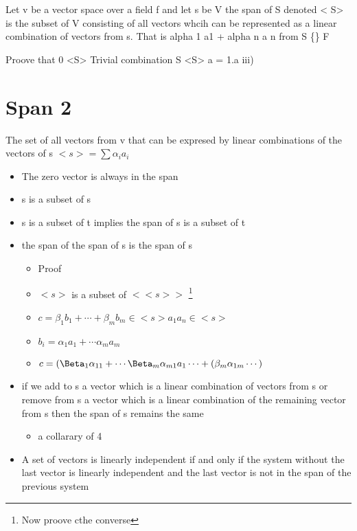\documentclass{tufte-handout}
\providecommand{\tightlist}{%
  \setlength{\itemsep}{0pt}\setlength{\parskip}{0pt}}
\begin{document}
Let v be a vector space over a field f and let s be \subset V the span
of S denoted \textless{} S\textgreater{} is the subset of V consisting
of all vectors whcih can be represented as a linear combination of
vectors from s. That is alpha 1 a1 + alpha n a n from S \{\apha\} \in F

Proove that 0 \in <S> Trivial combination S \in <S> a = 1.a iii)

\hypertarget{span-2}{%
\section{Span 2}\label{span-2}}

The set of all vectors from v that can be expresed by linear
combinations of the vectors of s \(<s> = \sum \alpha _i a_i\)

\begin{itemize}
\tightlist
\item
  The zero vector is always in the span
\item
  s is a subset of s
\item
  s is a subset of t implies the span of s is a subset of t
\item
  the span of the span of s is the span of s

  \begin{itemize}
  \tightlist
  \item
    Proof
  \item
    \(<s>\) is a subset of \(<<s>>\) \footnote{Now proove cthe converse}
  \item
    \(c=\beta_1b_1 + \cdots + \beta_m b_m \in <s> a_1 a_n\in <s>\)
  \item
    \(b_i = \alpha_1a_1 + \cdots \alpha_ma_m\)
  \item
    \(c=(\Beta_1\alpha_{11}+\cdots \Beta_m \alpha_{m1}a_1 \cdots + (\beta_m \alpha_{1m}\cdots)\)
  \end{itemize}
\item
  if we add to s a vector which is a linear combination of vectors from
  s or remove from s a vector which is a linear combination of the
  remaining vector from s then the span of s remains the same

  \begin{itemize}
  \tightlist
  \item
    a collarary of 4
  \end{itemize}
\item
  A set of vectors is linearly independent if and only if the system
  without the last vector is linearly independent and the last vector is
  not in the span of the previous system


\end{itemize}
\end{document}
